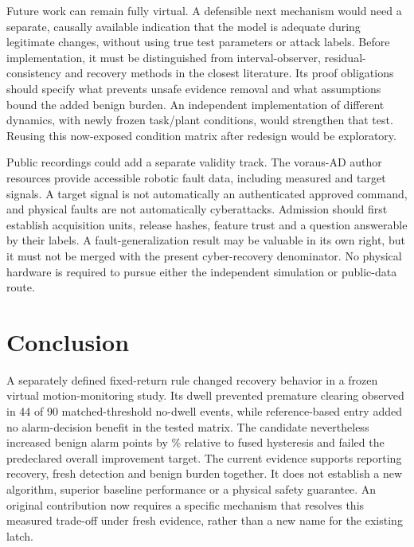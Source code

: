 Future work can remain fully virtual. A defensible next mechanism would need a separate, causally available indication that the model is adequate during legitimate changes, without using true test parameters or attack labels. Before implementation, it must be distinguished from interval-observer, residual-consistency and recovery methods in the closest literature. Its proof obligations should specify what prevents unsafe evidence removal and what assumptions bound the added benign burden. An independent implementation of different dynamics, with newly frozen task/plant conditions, would strengthen that test. Reusing this now-exposed condition matrix after redesign would be exploratory.

Public recordings could add a separate validity track. The voraus-AD author resources provide accessible robotic fault data, including measured and target signals. A target signal is not automatically an authenticated approved command, and physical faults are not automatically cyberattacks. Admission should first establish acquisition units, release hashes, feature trust and a question answerable by their labels. A fault-generalization result may be valuable in its own right, but it must not be merged with the present cyber-recovery denominator. No physical hardware is required to pursue either the independent simulation or public-data route.

\section{Conclusion}
A separately defined fixed-return rule changed recovery behavior in a frozen virtual motion-monitoring study. Its dwell prevented premature clearing observed in 44 of 90 matched-threshold no-dwell events, while reference-based entry added no alarm-decision benefit in the tested matrix. The candidate nevertheless increased benign alarm points by \RelativeIncrease\% relative to fused hysteresis and failed the predeclared overall improvement target. The current evidence supports reporting recovery, fresh detection and benign burden together. It does not establish a new algorithm, superior baseline performance or a physical safety guarantee. An original contribution now requires a specific mechanism that resolves this measured trade-off under fresh evidence, rather than a new name for the existing latch.
